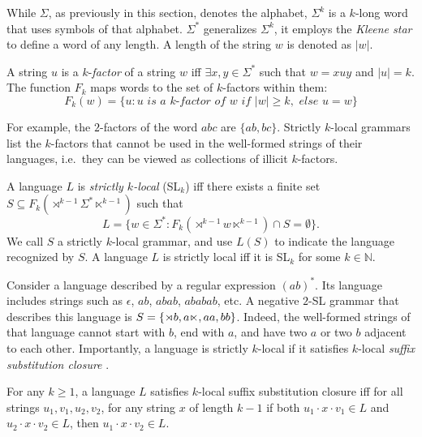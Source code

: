While $\Sigma$, as previously in this section, denotes the alphabet, $\Sigma^{k}$ is a $k$-long word that uses symbols of that alphabet.
$\Sigma^{*}$ generalizes $\Sigma^{k}$, it employs the \emph{Kleene star} \citep{Kleene1956} to define a word of any length.
A length of the string $w$ is denoted as $|w|$.

\begin{definition}
A string $u$ is a $k$-\emph{factor} of a string $w$ iff $\exists x, y \in \Sigma^*$ such that $w=xuy$ and $|u| = k$. 
The function $F_k$ maps words to the set of $k$-factors within them:
$$
F_k(w) = \{ u : u \textit{ is a $k$-factor of } w \textit{ if } |w| \geq k, 
\textit{ else } u = w\}
$$
\end{definition}

For example, the $2$-factors of the word $abc$ are $\{ab, bc\}$.
Strictly $k$-local grammars list the $k$-factors that cannot be used in the well-formed strings of their languages, i.e.\ they can be viewed as collections of illicit $k$-factors.

\begin{definition}
A language $L$ is \emph{strictly $k$-local} (SL$_k$) iff there exists a finite set $S \subseteq F_k (\rtimes^{k-1} \Sigma^* \ltimes^{k-1})$ such that
\[
L = \{ w \in \Sigma^*: F_k(\rtimes^{k-1} w \ltimes^{k-1}) \cap S = \emptyset \}.
\]
We call $S$ a strictly $k$-local grammar, and use $L(S)$  to indicate the language recognized by $S$.
A language $L$ is strictly local iff it is SL$_k$ for some $k \in \mathbb{N}$.
\end{definition}

Consider a language described by a regular expression $(ab)^{*}$.
Its language includes strings such as $\epsilon$, $ab$, $abab$, $ababab$, etc.
A negative $2$-SL grammar that describes this language is $S = \{\rtimes b, a\ltimes, aa, bb\}$.
Indeed, the well-formed strings of that language cannot start with $b$, end with $a$, and have two $a$ or two $b$ adjacent to each other.
Importantly, a language is strictly $k$-local if it satisfies $k$-local \emph{suffix substitution closure} \citep{RogersPullum2011}.

\begin{definition}
\label{suffsubclosure}
For any $k \geq 1$, a language $L$ satisfies  $k$-local suffix substitution closure iff for all strings $u_1, v_1, u_2, v_2$, for any string $x$ of length $k - 1$ if both $u_1 \cdot x \cdot v_1 \in L$ and $u_2 \cdot x \cdot v_2 \in L$, then $u_1 \cdot x \cdot v_2 \in L$.
\end{definition}

